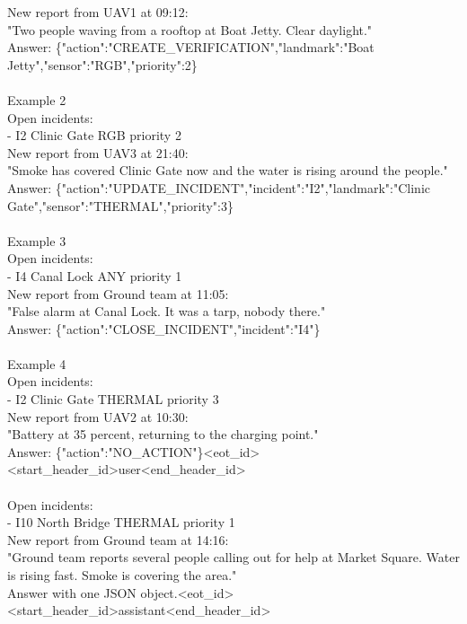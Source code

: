 \documentclass[10pt]{article}
\begin{document}
\begin{flushleft}
New report from UAV1 at 09:12:\\
"Two people waving from a rooftop at Boat Jetty. Clear daylight."\\
Answer: \{"action":"CREATE\_VERIFICATION",\allowbreak{}"landmark":"Boat
Jetty",\allowbreak{}"sensor":"RGB",\allowbreak{}"priority":2\}\\
\mbox{}\\
Example 2\\
Open incidents:\\
- I2 \textbar{} Clinic Gate \textbar{} RGB \textbar{} priority 2\\
New report from UAV3 at 21:40:\\
"Smoke has covered Clinic Gate now and the water is rising around the
people."\\
Answer: \{"action":"UPDATE\_INCIDENT",\allowbreak{}"incident":"I2",\allowbreak{}"landmark":"Clinic
Gate",\allowbreak{}"sensor":"THERMAL",\allowbreak{}"priority":3\}\\
\mbox{}\\
Example 3\\
Open incidents:\\
- I4 \textbar{} Canal Lock \textbar{} ANY \textbar{} priority 1\\
New report from Ground team at 11:05:\\
"False alarm at Canal Lock. It was a tarp,\allowbreak{} nobody there."\\
Answer: \{"action":"CLOSE\_INCIDENT",\allowbreak{}"incident":"I4"\}\\
\mbox{}\\
Example 4\\
Open incidents:\\
- I2 \textbar{} Clinic Gate \textbar{} THERMAL \textbar{} priority 3\\
New report from UAV2 at 10:30:\\
"Battery at 35 percent,\allowbreak{} returning to the charging point."\\
Answer:
\{"action":"NO\_ACTION"\}\textless\textbar eot\_id\textbar\textgreater{}\allowbreak{}\textless\textbar start\_header\_id\textbar\textgreater{}\allowbreak{}user\textless\textbar end\_header\_id\textbar\textgreater{}\allowbreak{}\\
\mbox{}\\
Open incidents:\\
- I10 \textbar{} North Bridge \textbar{} THERMAL \textbar{} priority 1\\
New report from Ground team at 14:16:\\
"Ground team reports several people calling out for help at Market
Square. Water is rising fast. Smoke is covering the area."\\
Answer with one JSON
object.\textless\textbar eot\_id\textbar\textgreater{}\allowbreak{}\textless\textbar start\_header\_id\textbar\textgreater{}\allowbreak{}assistant\textless\textbar end\_header\_id\textbar\textgreater{}\allowbreak{}\\
\mbox{}\\
\mbox{}
\end{flushleft}
\end{document}
